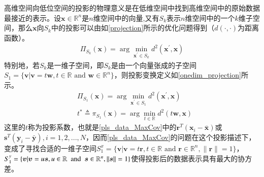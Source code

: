 高维空间向低位空间的投影的物理意义是在低维空间中找到高维空间中的原始数据最接近的表示。设$\bm{x} \in \mathbb{R}^{n}$是$n$维空间中的向量,又有$S_k$表示$n$维空间中的一个$k$维子空间，那么$\bm{x}$向$S_k$中的投影可以由如\ref{projection}所示的优化问题得到（$d(\cdot,\cdot)$为距离函数）。
\begin{equation}
\label{projection}
\begin{split}
\Pi_{S_k}(\bm{x})=\arg\min_{\bm{x}^{\prime} \in S_k}d^{2}(\bm{x}^{\prime},\bm{x})
\end{split}
\end{equation}
特别地，若$S_k$是一维子空间，即$S_k$是由一个向量张成的子空间$S_1=\{\bm{v}|\bm{v}=t\bm{w},t\in \mathbb{R}\text{ and }\bm{w}\in\mathbb{R}^{n}\}$，则投影变换定义如\ref{onedim_projection}所示。
\begin{equation}
\label{onedim_projection}
\begin{split}
&\Pi_{S_1}(\bm{x})=\arg\min_{\bm{x}^{\prime} \in S_1}d^{2}(\bm{x}^{\prime},\bm{x})\\
&t^{*} \triangleq \pi_{S_1}(\bm{x})=\arg\min_{t\in\mathbb{R}}d^{2}(t\bm{w},\bm{x})
\end{split}
\end{equation}
这里的$t$称为投影系数，也就是\ref{pls_data_MaxCov}中的$\bm{r}^{T}(\bm{x}_{i}-\bar{\bm{x}})$或$\bm{s}^{T}(\bm{y}_{i}-\bar{\bm{y}}),i=1,2,...,N$，因而\ref{pls_data_MaxCov}的问题在这个投影描述下，变成了寻找合适的一维子空间$S_{1}^{x}=\{\bm{v}|\bm{v}=t\bm{r},t\in \mathbb{R}\text{ and }\bm{r}\in\mathbb{R}^{n},\|\bm{r}\|=1\}$，$S_{1}^{y}=\{\bm{v}|\bm{v}=u\bm{s},u\in \mathbb{R}~~{\rm and}~~\bm{s}\in\mathbb{R}^{n},\|\bm{s}\|=1\}$使得投影后的数据表示具有最大的协方差。
